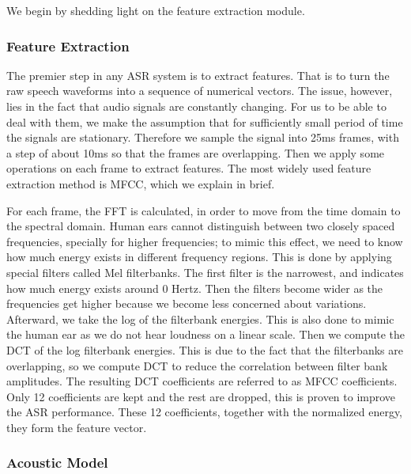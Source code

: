 We begin by shedding light on the feature extraction module.


\subsubsection{Feature Extraction} 
\label{bg:sub5}

The premier step in any \ac{ASR} system is to extract features. That is to turn the raw speech waveforms into a sequence of numerical vectors. The issue, however, lies in the fact that audio signals are constantly changing. For us to be able to deal with them, we make the assumption that for sufficiently small period of time the signals are stationary. Therefore we sample the signal into 25ms frames, with a step of about 10ms so that the frames are overlapping. Then we apply some operations on each frame to extract features. The most widely used feature extraction method is \ac{MFCC}, which we explain in brief.

For each frame, the \ac{FFT} is calculated, in order to move from the time domain to the spectral domain. Human ears cannot distinguish between two closely spaced frequencies, specially for higher frequencies; to mimic this effect, we need to know how much energy exists in different frequency regions. This is done by applying special filters called Mel filterbanks. The first filter is the narrowest, and indicates how much energy exists around 0 Hertz. Then the filters become wider as the frequencies get higher because we become less concerned about variations. 
Afterward, we take the log of the filterbank energies. This is also done to mimic the human ear as we do not hear loudness on a linear scale. 
Then we compute the \ac{DCT} of the log filterbank energies. This is due to the fact that the filterbanks are overlapping, so we compute \ac{DCT} to reduce the correlation between filter bank amplitudes. The resulting \ac{DCT} coefficients are referred to as MFCC coefficients. Only 12 coefficients are kept and the rest are dropped, this is proven to improve the \ac{ASR} performance. These 12 coefficients, together with the normalized energy, they form the feature vector.

\subsubsection{Acoustic Model} 
\label{bg:sub5}

